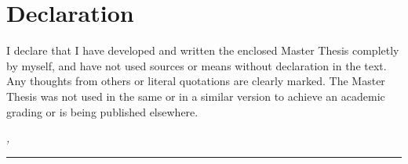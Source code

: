 
\chapter*{Declaration}
\label{sec:declaration}
\thispagestyle{empty}

I declare that I have developed and written the enclosed Master Thesis completly by myself, and have not used sources or means without declaration in the text. Any thoughts from others or literal quotations are clearly marked. The Master Thesis was not used in the same or in a similar version to achieve an academic grading or is being published elsewhere.

\bigskip

\noindent\textit{\thesisUniversityCity, \thesisDate}

\smallskip

\begin{flushright}
	\begin{minipage}{5cm}
		\rule{\textwidth}{1pt}
		\centering\thesisName
	\end{minipage}
\end{flushright}